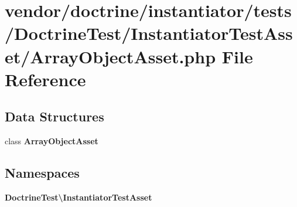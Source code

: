 \section{vendor/doctrine/instantiator/tests/\+Doctrine\+Test/\+Instantiator\+Test\+Asset/\+Array\+Object\+Asset.php File Reference}
\label{_array_object_asset_8php}
\subsection*{Data Structures}
\begin{DoxyCompactItemize}
\item 
class {\bf Array\+Object\+Asset}
\end{DoxyCompactItemize}
\subsection*{Namespaces}
\begin{DoxyCompactItemize}
\item 
 {\bf Doctrine\+Test\textbackslash{}\+Instantiator\+Test\+Asset}
\end{DoxyCompactItemize}
